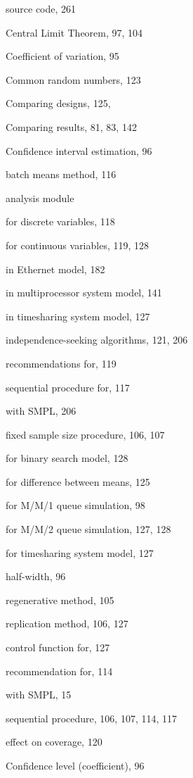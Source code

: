 \quad source code, 261\par
\noindent Central Limit Theorem, 97, 104\par
\noindent Coefficient of variation, 95\par
\noindent Common random numbers, 123\par
\noindent Comparing designs, 125,\par
\noindent Comparing results, 81, 83, 142\par
\noindent Confidence interval estimation, 96\par
\quad batch means method, 116\par
\qquad analysis module\par
\qquad\quad for discrete variables, 118\par
\qquad\quad for continuous variables, 119, 128\par
\qquad in Ethernet model, 182\par
\qquad in multiprocessor system model, 141\par
\qquad in timesharing system model, 127\par
\qquad independence-seeking algorithms, 121, 206\par
\qquad recommendations for, 119\par
\qquad sequential procedure for, 117\par
\qquad with SMPL, 206\par
\quad fixed sample size procedure, 106, 107\par
\quad for binary search model, 128\par
\quad for difference between means, 125\par
\quad for M/M/1 queue simulation, 98\par
\quad for M/M/2 queue simulation, 127, 128\par
\quad for timesharing system model, 127\par
\quad half-width, 96\par
\quad regenerative method, 105\par
\quad replication method, 106, 127\par
\qquad control function for, 127\par
\qquad recommendation for, 114\par
\qquad with SMPL, 15\par
\quad sequential procedure, 106, 107, 114, 117\par
\qquad effect on coverage, 120\par
\noindent Confidence level (coefficient), 96\par
